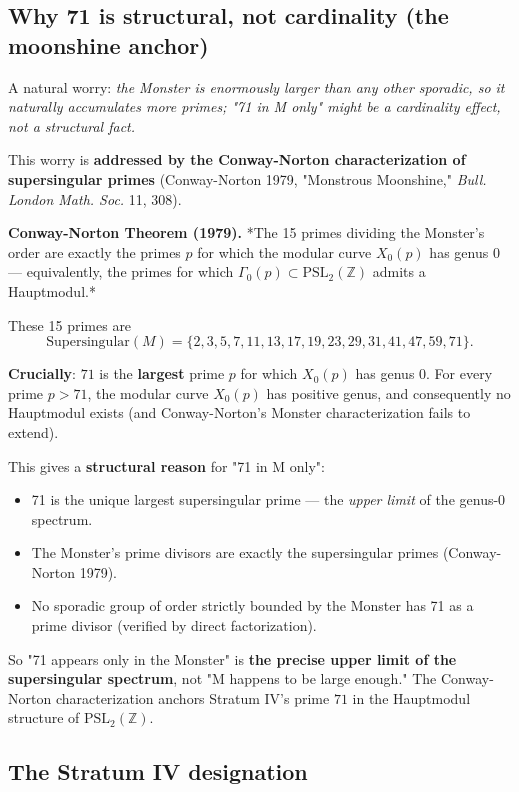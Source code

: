 \documentclass[11pt,reqno]{amsart}
\theoremstyle{plain}
\theoremstyle{definition}
\begin{document}
\subsection{Why 71 is structural, not cardinality (the moonshine anchor)}

A natural worry: \textit{the Monster is enormously larger than any other sporadic, so it naturally accumulates more primes; "71 in M only" might be a cardinality effect, not a structural fact.}

This worry is \textbf{addressed by the Conway-Norton characterization of supersingular primes} (Conway-Norton 1979, "Monstrous Moonshine," \textit{Bull. London Math. Soc.} 11, 308).

\textbf{Conway-Norton Theorem (1979).} *The 15 primes dividing the Monster's order are exactly the primes $p$ for which the modular curve $X_0(p)$ has genus $0$ --- equivalently, the primes for which $\Gamma_0(p) \subset \mathrm{PSL}_2(\mathbb{Z})$ admits a Hauptmodul.*

These 15 primes are
$$\mathrm{Supersingular}(M) = \{2, 3, 5, 7, 11, 13, 17, 19, 23, 29, 31, 41, 47, 59, 71\}.$$

\textbf{Crucially}: $71$ is the \textbf{largest} prime $p$ for which $X_0(p)$ has genus $0$. For every prime $p > 71$, the modular curve $X_0(p)$ has positive genus, and consequently no Hauptmodul exists (and Conway-Norton's Monster characterization fails to extend).

This gives a \textbf{structural reason} for "71 in M only":
\begin{itemize}
\item 71 is the unique largest supersingular prime --- the \textit{upper limit} of the genus-0 spectrum.
\item The Monster's prime divisors are exactly the supersingular primes (Conway-Norton 1979).
\item No sporadic group of order strictly bounded by the Monster has 71 as a prime divisor (verified by direct factorization).
\end{itemize}

So "71 appears only in the Monster" is \textbf{the precise upper limit of the supersingular spectrum}, not "M happens to be large enough." The Conway-Norton characterization anchors Stratum IV's prime $71$ in the Hauptmodul structure of $\mathrm{PSL}_2(\mathbb{Z})$.

\subsection{The Stratum IV designation}
\end{document}
